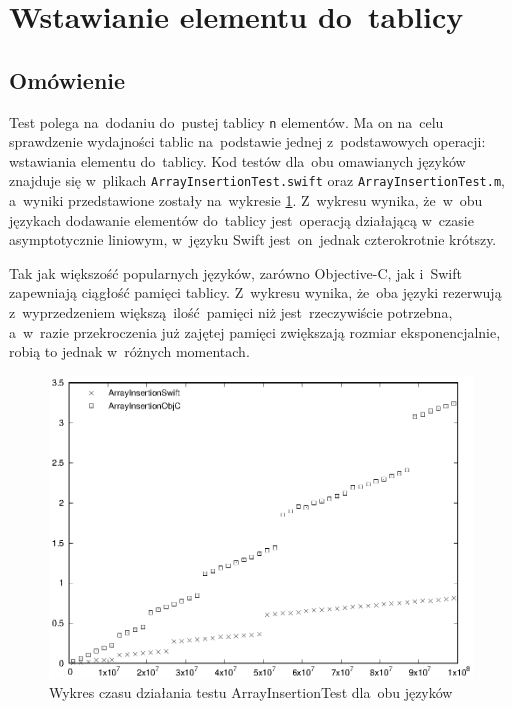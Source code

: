 \documentclass[mgr, shortabstract]{iithesis}
\newcommand{\swiftinline}[1]{
    \texttt{#1}
}
\begin{document}
\section{Wstawianie elementu do~tablicy}

\subsection{Omówienie}

Test polega na~dodaniu do~pustej tablicy \swiftinline{n} elementów. Ma on na~celu sprawdzenie wydajności tablic na~podstawie jednej z~podstawowych operacji: wstawiania elementu do~tablicy. Kod testów dla~obu omawianych języków znajduje się w~plikach \texttt{ArrayInsertionTest.swift} oraz \texttt{ArrayInsertionTest.m}, a~wyniki przedstawione zostały na~wykresie \ref{p:array_insertion}. Z~wykresu wynika, że~w~obu językach dodawanie elementów do~tablicy jest~operacją działającą w~czasie asymptotycznie liniowym, w~języku Swift jest~on~jednak czterokrotnie krótszy.

Tak jak większość popularnych języków, zarówno Objective-C, jak i~Swift zapewniają ciągłość pamięci tablicy. Z~wykresu wynika, że~oba języki rezerwują z~wyprzedzeniem większą ilość pamięci niż jest~rzeczywiście potrzebna, a~w~razie przekroczenia już zajętej pamięci zwiększają rozmiar eksponencjalnie, robią to jednak w~różnych momentach.

\begin{figure}[ht]
    \includegraphics{plots/ArrayInsertion.eps}
    \caption{Wykres czasu działania testu ArrayInsertionTest dla~obu języków}
    \label{p:array_insertion}
\end{figure}
\end{document}
